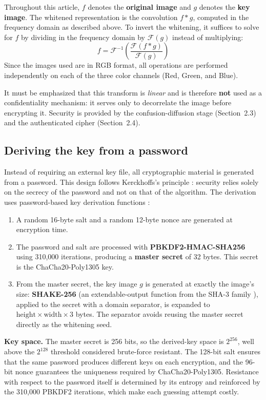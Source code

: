 \documentclass{llncs}
\begin{document}
Throughout this article, $f$ denotes the \textbf{original image} and $g$
denotes the \textbf{key image}. The whitened representation is the
convolution $f * g$, computed in the frequency domain as described above. To
invert the whitening, it suffices to solve for $f$ by dividing in the
frequency domain by $\mathcal{F}(g)$ instead of multiplying:
\[
f = \mathcal{F}^{-1}\left(\frac{\mathcal{F}(f * g)}{\mathcal{F}(g)}\right)
\]
Since the images used are in RGB format, all operations are performed
independently on each of the three color channels (Red, Green, and Blue).

It must be emphasized that this transform is \emph{linear} and is therefore
\textbf{not} used as a confidentiality mechanism: it serves only to
decorrelate the image before encrypting it. Security is provided by the
confusion-diffusion stage (Section~2.3) and the authenticated cipher
(Section~2.4).

\subsection{Deriving the key from a password}

Instead of requiring an external key file, all cryptographic material is
generated from a password. This design follows Kerckhoffs's principle
\cite{kerckhoffs}: security relies solely on the secrecy of the password and
not on that of the algorithm. The derivation uses password-based key
derivation functions \cite{nist800132,scrypt}:

\begin{enumerate}
  \item A random 16-byte salt and a random 12-byte nonce are generated at
    encryption time.
  \item The password and salt are processed with \textbf{PBKDF2-HMAC-SHA256}
    \cite{pbkdf2} using 310{,}000 iterations, producing a \textbf{master
    secret} of 32 bytes. This secret is the ChaCha20-Poly1305 key.
  \item From the master secret, the key image $g$ is generated at exactly
    the image's size: \textbf{SHAKE-256} (an extendable-output function from
    the SHA-3 family \cite{sha3}), applied to the secret with a domain
    separator, is expanded to $\text{height}\times\text{width}\times 3$
    bytes. The separator avoids reusing the master secret directly as the
    whitening seed.
\end{enumerate}

\textbf{Key space.} The master secret is 256 bits, so the derived-key space
is $2^{256}$, well above the $2^{128}$ threshold considered brute-force
resistant. The 128-bit salt ensures that the same password produces different
keys on each encryption, and the 96-bit nonce guarantees the uniqueness
required by ChaCha20-Poly1305. Resistance with respect to the password itself
is determined by its entropy and reinforced by the 310{,}000 PBKDF2
iterations, which make each guessing attempt costly.
\end{document}
